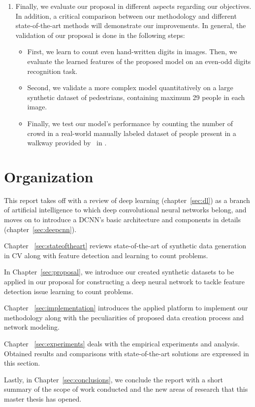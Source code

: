 \begin{enumerate}
	\item Finally, we evaluate our proposal in different aspects regarding our objectives. In addition, a critical comparison between our methodology and different state-of-the-art methods will demonstrate our improvements. In general, the validation of our proposal is done in the following steps:

	\begin{itemize}
		\item First, we learn to count even hand-written digits in images. Then, we evaluate the learned features of the proposed model on an even-odd digits recognition task. 
		\item Second, we validate a more complex model  quantitatively on a large synthetic dataset of pedestrians, containing maximum 29 people in each image. 
		\item Finally, we test our model's performance by counting the number of crowd in a real-world manually labeled dataset of people present in a walkway provided by~\citeauthor{chan2013ground} in \cite{chan2013ground}. 
	\end{itemize}
	
\end{enumerate}

\section{Organization}

This report takes off with a review of deep learning (chapter~\ref{sec:dl}) as a branch of artificial intelligence to which deep convolutional neural networks belong, and moves on to introduce a DCNN's basic architecture and components in details (chapter~\ref{sec:deepcnn}). 


Chapter ~\ref{sec:stateoftheart} reviews state-of-the-art of synthetic data generation in CV along with feature detection and learning to count problems. 

In Chapter~\ref{sec:proposal}, we introduce our created synthetic datasets to be applied in our proposal for constructing a deep neural network to tackle feature detection issue learning to count problems. 

Chapter ~\ref{sec:implementation} introduces the applied platform to implement our methodology along with the peculiarities of proposed data creation process and network modeling. 

Chapter ~\ref{sec:experiments} deals with the empirical experiments and analysis. Obtained results and comparisons with state-of-the-art solutions are expressed in this section.

Lastly, in Chapter~\ref{sec:conclusions}, we conclude the report with a short summary of the scope of work conducted and the new areas of research that this master thesis has opened.
